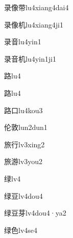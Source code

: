 \begin{verbete}[8;13;9]{录像带}{lu4xiang4dai4}
\end{verbete}

\begin{verbete}[8;13;6]{录像机}{lu4xiang4ji1}
\end{verbete}

\begin{verbete}[8;9]{录音}{lu4yin1}
\end{verbete}

\begin{verbete}[8;9;6]{录音机}{lu4yin1ji1}
\end{verbete}

\begin{verbete}[13]{路}{lu4}
\end{verbete}
\begin{verbete*}[13]{路}{lu4}
\end{verbete*}

\begin{verbete}[13;3]{路口}{lu4kou3}
\end{verbete}

\begin{verbete*}[6;12]{伦敦}{lun2dun1}
\end{verbete*}

\begin{verbete}[10;6]{旅行}{lv3xing2}
\end{verbete}

\begin{verbete}[10;12]{旅游}{lv3you2}
\end{verbete}

\begin{verbete}[11]{绿}{lv4}
\end{verbete}

\begin{verbete}[11;7]{绿豆}{lv4dou4}
\end{verbete}

\begin{verbete}[11;7;7]{绿豆芽}{lv4dou4·ya2}
\end{verbete}

\begin{verbete}[11;6]{绿色}{lv4se4}
\end{verbete}



